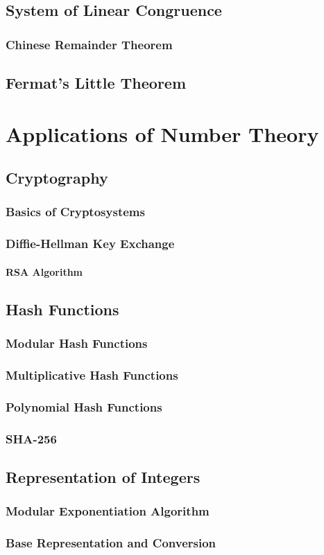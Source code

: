 \documentclass[oneside]{book}
\begin{document}
\section{System of Linear Congruence}
\subsection{Chinese Remainder Theorem}
\section{Fermat's Little Theorem}

\chapter{Applications of Number Theory}
\section{Cryptography}
\subsection{Basics of Cryptosystems}
\subsection{Diffie-Hellman Key Exchange}
\subsubsection{RSA Algorithm}
\section{Hash Functions}
\subsection{Modular Hash Functions}
\subsection{Multiplicative Hash Functions}
\subsection{Polynomial Hash Functions}
\subsection{SHA-256}
\section{Representation of Integers}
\subsection{Modular Exponentiation Algorithm}
\subsection{Base Representation and Conversion}

\nocite{*}
\printbibliography
\end{document}
